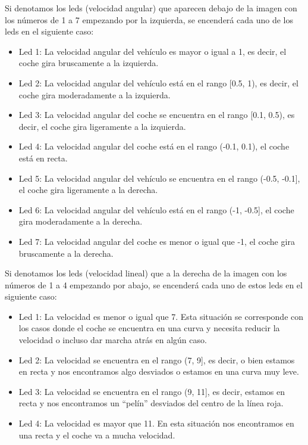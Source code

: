 Si denotamos los leds (velocidad angular) que aparecen debajo de la imagen con los números de 1 a 7 empezando por la izquierda, se encenderá cada uno de los leds en el siguiente caso:

\begin{itemize}
    \item Led 1: La velocidad angular del vehículo es mayor o igual a 1, es decir, el coche gira bruscamente a la izquierda.
    
    \item Led 2: La velocidad angular del vehículo está en el rango [0.5, 1), es decir, el coche gira moderadamente a la izquierda.
    
    \item Led 3:  La velocidad angular del coche se encuentra en el rango [0.1, 0.5), es decir, el coche gira ligeramente a la izquierda.
    
    \item Led 4: La velocidad angular del coche está en el rango (-0.1, 0.1), el coche está en recta.
    
    \item Led 5: La velocidad angular del vehículo se encuentra en el rango (-0.5, -0.1],  el coche gira ligeramente a la derecha.
    
     \item Led 6: La velocidad angular del vehículo está en el rango (-1, -0.5], el coche gira moderadamente a la derecha.
     
     \item Led 7: La velocidad angular del coche es menor o igual que -1, el coche gira bruscamente a la derecha.
\end{itemize}

Si denotamos los leds (velocidad lineal) que a la derecha de la imagen con los números de 1 a 4 empezando por abajo, se encenderá cada uno de estos leds en el siguiente caso:

\begin{itemize}
    \item Led 1: La velocidad es menor o igual que 7. Esta situación se corresponde con los casos donde el coche se encuentra en una curva y necesita reducir la velocidad o incluso dar marcha atrás en algún caso.
    
    \item Led 2: La velocidad se encuentra en el rango (7, 9], es decir, o bien estamos en recta y nos encontramos algo desviados o estamos en una curva muy leve.
    
    \item Led 3: La velocidad se encuentra en el rango (9, 11], es decir, estamos en recta y nos encontramos un ``pelín'' desviados del centro de la línea roja.
    
    \item Led 4: La velocidad es mayor que 11. En esta situación nos encontramos en una recta y el coche va a mucha velocidad.
\end{itemize}


